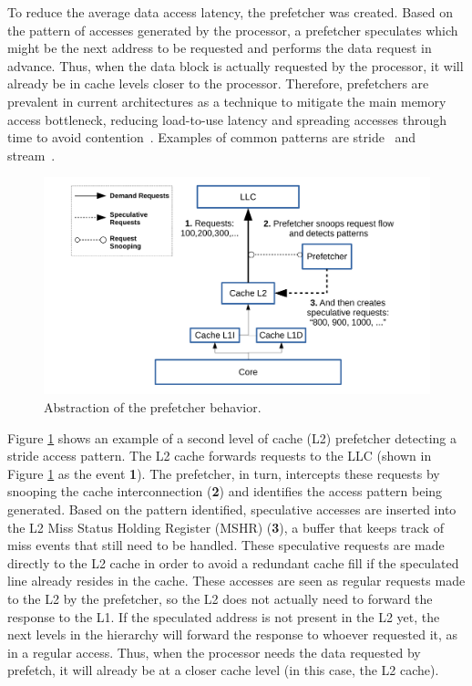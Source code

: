 \documentclass[AMA,final,STIX1COL]{WileyNJD-v2}
\begin{document}
To reduce the average data access latency, the prefetcher was created.
Based on the pattern of accesses generated by the processor, a prefetcher speculates which might be the next address to be requested and performs the data request in advance.
Thus, when the data block is actually requested by the processor, it will already be in cache levels closer to the processor.
Therefore, prefetchers are prevalent in current architectures as a technique to mitigate the main memory access bottleneck, reducing load-to-use latency and spreading accesses through time to avoid contention~\cite{bakhshalipour2019bingo}.
Examples of common patterns are stride~\cite{chen1995effective} and stream~\cite{le2007ibm}.

\begin{figure}[!htb]
    \centering
        \includegraphics[width=.7\textwidth]{figures/figpref-en.pdf}
  \caption{Abstraction of the prefetcher behavior.}
  \label{fig:prefetcher}
\end{figure}

Figure \ref{fig:prefetcher} shows an example of a second level of cache (L2) prefetcher detecting a stride access pattern.
The L2 cache forwards requests to the LLC (shown in Figure \ref{fig:prefetcher} as the event \textbf{1}).
The prefetcher, in turn, intercepts these requests by snooping the cache interconnection (\textbf{2}) and identifies the access pattern being generated.
Based on the pattern identified, speculative accesses are inserted into the L2 Miss Status Holding Register (MSHR) (\textbf{3}), a buffer that keeps track of miss events that still need to be handled.
These speculative requests are made directly to the L2 cache in order to avoid a redundant cache fill if the speculated line already resides in the cache.
These accesses are seen as regular requests made to the L2 by the prefetcher, so the L2 does not actually need to forward the response to the L1.
If the speculated address is not present in the L2 yet, the next levels in the hierarchy will forward the response to whoever requested it, as in a regular access.
Thus, when the processor needs the data requested by prefetch, it will already be at a closer cache level (in this case, the L2 cache).
\end{document}
